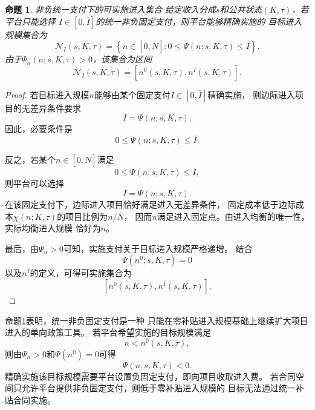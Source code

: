 \documentclass[UTF8, a4paper, 12pt, fontset=fandol]{ctexart}
\newtheorem{proposition}[theorem]{命题}
\theoremstyle{definition}
\theoremstyle{remark}
\begin{document}
\begin{proposition}{非负统一支付下的可实施进入集合}
  \label{prop:implementable-entry-set}
  给定收入分成$s$和公共状态$(K,\tau)$，若平台只能选择
  $I\in[0,\bar I]$的统一非负固定支付，则平台能够精确实施的
  目标进入规模集合为
  \begin{equation}
    \mathcal N_I(s,K,\tau)
    =
    \left\{
      n\in[0,\bar N]:
      0
      \leq
      \Psi(n;s,K,\tau)
      \leq
      \bar I
    \right\}.
    \label{eq:implementable-entry-set}
  \end{equation}
    由于$\Psi_n(n;s,K,\tau)>0$，该集合为区间
  \begin{equation}
    \mathcal N_I(s,K,\tau)
    =
    \left[
      n^0(s,K,\tau),
      n^{\bar I}(s,K,\tau)
    \right].
    \label{eq:implementable-entry-interval}
  \end{equation}
\end{proposition}
\begin{proof}
  若目标进入规模$n$能够由某个固定支付$I\in[0,\bar I]$精确实施，
  则边际进入项目的无差异条件要求
  \begin{equation*}
    I=\Psi(n;s,K,\tau).
  \end{equation*}
  因此，必要条件是
  \begin{equation*}
    0\leq\Psi(n;s,K,\tau)\leq\bar I.
  \end{equation*}

  反之，若某个$n\in[0,\bar N]$满足
  \begin{equation*}
    0\leq\Psi(n;s,K,\tau)\leq\bar I,
  \end{equation*}
  则平台可以选择
  \begin{equation*}
    I=\Psi(n;s,K,\tau).
  \end{equation*}
  在该固定支付下，边际进入项目恰好满足进入无差异条件，
  固定成本低于边际成本$\chi(n;K,\tau)$的项目比例为$n/\bar N$，
  因而$n$满足进入固定点。由进入均衡的唯一性，实际均衡进入规模
  恰好为$n$。

  最后，由$\Psi_n>0$可知，实施支付关于目标进入规模严格递增。
  结合
  \begin{equation*}
    \Psi(n^0;s,K,\tau)=0
  \end{equation*}
  以及$n^{\bar I}$的定义，可得可实施集合为
  \begin{equation*}
    \left[n^0(s,K,\tau),n^{\bar I}(s,K,\tau)\right].
  \end{equation*}
\end{proof}

命题\ref{prop:implementable-entry-set}表明，统一非负固定支付是一种
只能在零补贴进入规模基础上继续扩大项目进入的单向政策工具。
若平台希望实施的目标规模满足
\begin{equation*}
  n<n^0(s,K,\tau),
\end{equation*}
则由$\Psi_n>0$和$\Psi(n^0)=0$可得
\begin{equation*}
  \Psi(n;s,K,\tau)<0.
\end{equation*}
精确实施该目标规模需要平台设置负固定支付，即向项目收取进入费。
若合同空间只允许平台提供非负固定支付，则低于零补贴进入规模的
目标无法通过统一补贴合同实施。
\end{document}
